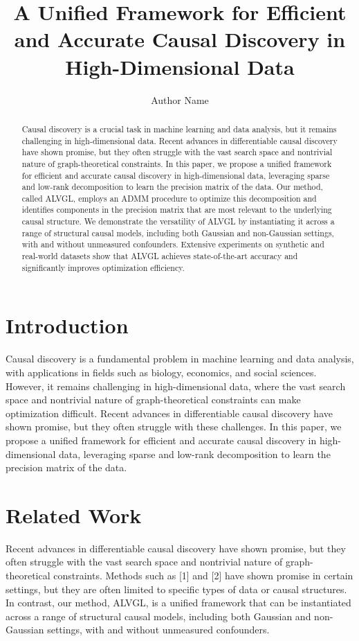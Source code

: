 \documentclass{article}
\begin{document}
        \title{A Unified Framework for Efficient and Accurate Causal Discovery in High-Dimensional Data}

        \author{Author Name}

        \maketitle

        \begin{abstract}
        Causal discovery is a crucial task in machine learning and data analysis, but it remains challenging in high-dimensional data. Recent advances in differentiable causal discovery have shown promise, but they often struggle with the vast search space and nontrivial nature of graph-theoretical constraints. In this paper, we propose a unified framework for efficient and accurate causal discovery in high-dimensional data, leveraging sparse and low-rank decomposition to learn the precision matrix of the data. Our method, called ALVGL, employs an ADMM procedure to optimize this decomposition and identifies components in the precision matrix that are most relevant to the underlying causal structure. We demonstrate the versatility of ALVGL by instantiating it across a range of structural causal models, including both Gaussian and non-Gaussian settings, with and without unmeasured confounders. Extensive experiments on synthetic and real-world datasets show that ALVGL achieves state-of-the-art accuracy and significantly improves optimization efficiency.
        \end{abstract}

        \section{Introduction}
        Causal discovery is a fundamental problem in machine learning and data analysis, with applications in fields such as biology, economics, and social sciences. However, it remains challenging in high-dimensional data, where the vast search space and nontrivial nature of graph-theoretical constraints can make optimization difficult. Recent advances in differentiable causal discovery have shown promise, but they often struggle with these challenges. In this paper, we propose a unified framework for efficient and accurate causal discovery in high-dimensional data, leveraging sparse and low-rank decomposition to learn the precision matrix of the data.

        \section{Related Work}
        Recent advances in differentiable causal discovery have shown promise, but they often struggle with the vast search space and nontrivial nature of graph-theoretical constraints. Methods such as [1] and [2] have shown promise in certain settings, but they are often limited to specific types of data or causal structures. In contrast, our method, ALVGL, is a unified framework that can be instantiated across a range of structural causal models, including both Gaussian and non-Gaussian settings, with and without unmeasured confounders.
\end{document}
